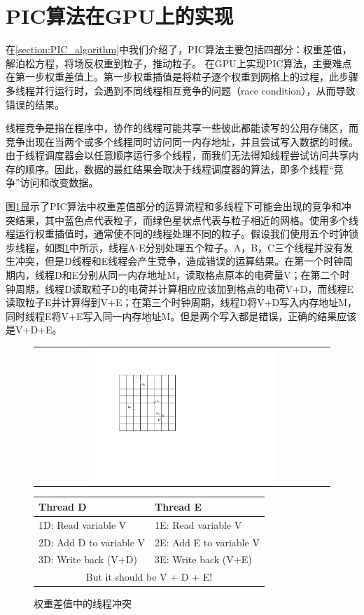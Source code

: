 \section{PIC算法在GPU上的实现}
在\ref{section:PIC_algorithm}中我们介绍了，PIC算法主要包括四部分：权重差值，解泊松方程，将场反权重到粒子，推动粒子。
在GPU上实现PIC算法，主要难点在第一步权重差值上。第一步权重插值是将粒子逐个权重到网格上的过程，此步骤多线程并行运行时，会遇到不同线程相互竞争的问题（race condition），从而导致错误的结果。

线程竞争是指在程序中，协作的线程可能共享一些彼此都能读写的公用存储区，而竞争出现在当两个或多个线程同时访问同一内存地址，并且尝试写入数据的时候。由于线程调度器会以任意顺序运行多个线程，而我们无法得知线程尝试访问共享内存的顺序。因此，数据的最红结果会取决于线程调度器的算法，即多个线程“竞争”访问和改变数据。

图\ref{fig:PIC_weighting}显示了PIC算法中权重差值部分的运算流程和多线程下可能会出现的竞争和冲突结果，其中蓝色点代表粒子，而绿色星状点代表与粒子相近的网格。使用多个线程运行权重插值时，通常使不同的线程处理不同的粒子。假设我们使用五个时钟锁步线程，如图\ref{fig:PIC_weighting}中所示，线程A-E分别处理五个粒子。A，B，C三个线程并没有发生冲突，但是D线程和E线程会产生竞争，造成错误的运算结果。在第一个时钟周期内，线程D和E分别从同一内存地址M，读取格点原本的电荷量V；在第二个时钟周期，线程D读取粒子D的电荷并计算相应应该加到格点的电荷V+D，而线程E读取粒子E并计算得到V+E；在第三个时钟周期，线程D将V+D写入内存地址M，同时线程E将V+E写入同一内存地址M。但是两个写入都是错误，正确的结果应该是V+D+E。

\begin{figure}[!htb]
  \centering
  \begin{tabular}{|l|l|}
    \multicolumn{2}{c}{
    \includegraphics[width=0.65\textwidth]{Img/3PIC_weighting.pdf}} \\
  \end{tabular}
  \begin{tabular}{|l|l|}
    \hline
    Thread D & Thread E  \\
    \hline
    1D: Read variable V     & 1E: Read variable V     \\
    2D: Add D to variable V & 2E: Add E to variable V \\
    3D: Write back (V+D)    & 3E: Write back (V+E)    \\
    \hline
    \multicolumn{2}{c}{But it should be V + D + E!}
  \end{tabular}
  \caption{权重差值中的线程冲突}
  \label{fig:PIC_weighting}
\end{figure}

